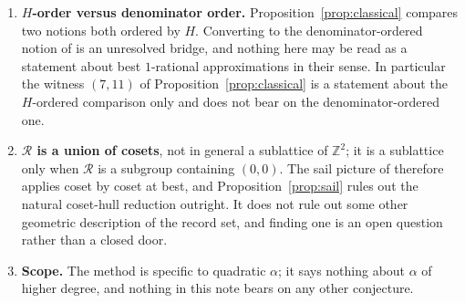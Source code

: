 \documentclass[11pt]{article}
\theoremstyle{definition}
\theoremstyle{remark}
\newcommand{\Z}{\mathbb{Z}}
\begin{document}
\begin{enumerate}
\begin{itemize}
\item \cite{KushwahaSarma} develops best approximation for
$\mathcal F_{p^\ell}$-continued fractions. The congruence structure there is supplied by a fixed
prime power and the approximants are reduced fractions compared under denominator ordering; here
$M$ and $\mathcal R$ are arbitrary, imprimitive pairs are admissible and are shown to occur
among records, and the order is $H$.
\item \cite{HanLee2025} proves moment formulas for Siegel transforms under congruence
conditions in dimension $2$, with a Schmidt-type counting theorem and a quantitative Khintchine
theorem for approximation by $p/q$ with congruence constraints on the pair. Those are counting
and metric statements --- almost-everywhere and on average, for primitive pairs --- whereas the
present question is the exact identification of individual record states for a fixed $\alpha$.
\item \cite{SpaldingVeselov} relates the Conway river of a real indefinite binary quadratic form
to the Arnold sail of the corresponding pair of lines; the sails there are attached to a
specified pair of lines. The forms are the same objects as $Q$ here, so the comparison is
natural, but Proposition~\ref{prop:sail} shows the records of $\varepsilon$ are not in general
hull vertices of their admissible cone, so no reading-off of records from such a sail is
available.
\end{itemize}
None of this establishes priority in either direction, and references that bear on the question
are welcome.
\item \textbf{$H$-order versus denominator order.} Proposition~\ref{prop:classical} compares two
notions both ordered by $H$. Converting to the denominator-ordered notion of
\cite{KimLeeLiao2022,KimLeeLiao2025,KushwahaSarma} is an unresolved bridge, and nothing here may
be read as a statement about best $1$-rational approximations in their sense. In particular the
witness $(7,11)$ of Proposition~\ref{prop:classical} is a statement about the $H$-ordered
comparison only and does not bear on the denominator-ordered one.
\item \textbf{$\mathcal R$ is a union of cosets}, not in general a sublattice of $\Z^2$; it is a
sublattice only when $\mathcal R$ is a subgroup containing $(0,0)$. The sail picture of
\cite{Karpenkov2013,SpaldingVeselov} therefore applies coset by coset at best, and
Proposition~\ref{prop:sail} rules out the natural coset-hull reduction outright. It does not rule
out some other geometric description of the record set, and finding one is an open question
rather than a closed door.
\item \textbf{Scope.} The method is specific to quadratic $\alpha$; it says nothing about
$\alpha$ of higher degree, and nothing in this note bears on any other conjecture.
\end{enumerate}
\end{document}
